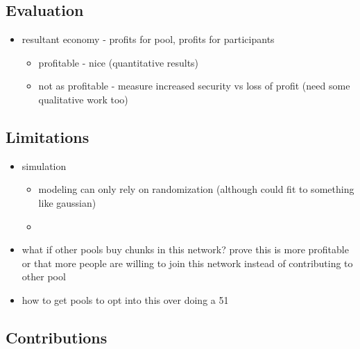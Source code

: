 \subsection{Evaluation}

\begin{itemize}
  \item resultant economy - profits for pool, profits for participants
    \begin{itemize}
      \item profitable - nice (quantitative results)
      \item not as profitable - measure increased security vs loss of profit (need some qualitative work too)
    \end{itemize}
\end{itemize}

\subsection{Limitations}

\begin{itemize}
  \item simulation
    \begin{itemize}
      \item modeling can only rely on randomization (although could fit to something like gaussian)
      \item
    \end{itemize}
  \item what if other pools buy chunks in this network? prove this is more profitable or that more people are willing to join this network instead of contributing to other pool
  \item how to get pools to opt into this over doing a 51%
\end{itemize}

\subsection{Contributions}